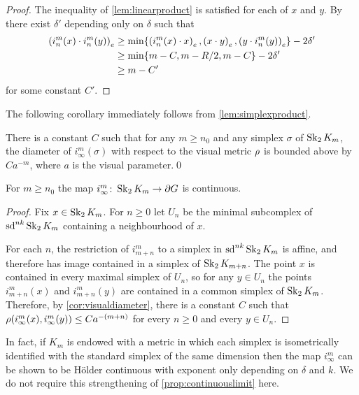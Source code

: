 \documentclass[a4paper]{article}
\begin{document}
\begin{proof}
  The inequality of \cref{lem:linearproduct} is satisfied for each of $x$ 
  and $y$. By~\cite[Proposition III.H.1.22]{bridsonhaefliger99} there exist
  $\delta'$ depending only on $\delta$ such that
  \begin{align*}
    \gromov{e}{i^m_n(x)}{i^m_n(y)} &\geq \min\{\gromov{e}{i^m_n(x)}{x}, 
    \gromov{e}{x}{y}, \gromov{e}{y}{i^m_n(y)}\} - 2\delta'\\
    &\geq \min\{m - C, m - R/2, m - C\} - 2\delta' \\
    &\geq m - C'
  \end{align*}
  for some constant $C'$.
\end{proof}

The following corollary immediately follows from \cref{lem:simplexproduct}.

\begin{corollary}\label{cor:visualdiameter}
  There is a constant $C$ such that for any $m\geq n_0$ and any simplex
  $\sigma$ of $\Skel_2 K_m$, the diameter of $i^m_{\infty}(\sigma)$ with
  respect to the visual metric $\vdistance$ is bounded above by $Ca^{-m}$,
  where $a$ is the visual parameter.\qed
\end{corollary}

\begin{proposition}\label{prop:continuouslimit}
  For $m\geq n_0$ the map $i^m_\infty\from \Skel_2 K_m \to \boundary G$ is
  continuous.
\end{proposition}

\begin{proof}
  Fix $x \in \Skel_2 K_m$. For $n\geq 0$ let $U_n$ be the minimal subcomplex of
  $\sd^{nk}\Skel_2 K_m$ containing a neighbourhood of $x$.

  For each $n$, the restriction of $i^m_{m+n}$ to a simplex in 
  $\sd^{nk}\Skel_2K_m$ is affine, and therefore has image contained in a 
  simplex of $\Skel_2 K_{m+n}$. The point $x$ is contained in every maximal simplex 
  of $U_n$, so for any $y \in U_n$ the points $i^m_{m+n}(x)$ and $i^m_{m+n}(y)$ 
  are contained in a common simplex of $\Skel_2K_m$. Therefore, by 
  \cref{cor:visualdiameter}, there is a constant $C$ such that 
  $\vdistance(i^m_\infty(x), i^m_\infty(y)) \leq Ca^{-(m+n)}$ for every $n \geq
  0$ and every $y \in U_n$.
\end{proof}

\begin{remark}
  In fact, if $K_m$ is endowed with a metric in which each simplex is 
  isometrically identified with the standard simplex of the same dimension then 
  the map $i^m_\infty$ can be shown to be H\"{o}lder continuous with exponent 
  only depending on $\delta$ and $k$.  We do not require this strengthening of
  \cref{prop:continuouslimit} here.
\end{remark}
\end{document}
